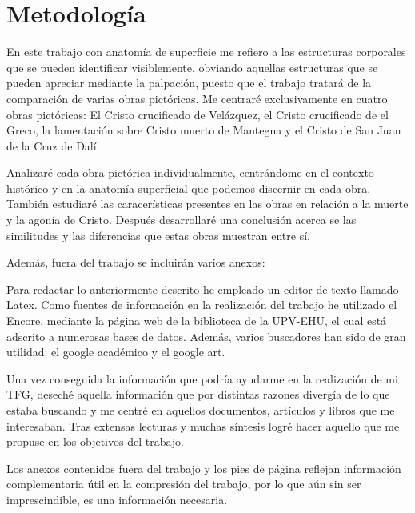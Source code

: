 \section{Metodología}
En este trabajo con anatomía de superficie me refiero a las estructuras corporales que se pueden identificar visiblemente, obviando aquellas estructuras que se pueden apreciar mediante la palpación, puesto que el trabajo tratará de la comparación de varias obras pictóricas. Me centraré exclusivamente en cuatro obras pictóricas: El Cristo crucificado de Velázquez, el Cristo crucificado de el Greco, la lamentación sobre Cristo muerto de Mantegna %
y el Cristo de San Juan de la Cruz de Dalí.


Analizaré cada obra pictórica individualmente, centrándome en el contexto histórico y en la anatomía superficial que podemos discernir en cada obra. También estudiaré las caracerísticas presentes en las obras en relación a la muerte y la agonía de Cristo. Después desarrollaré una conclusión acerca se las similitudes y las diferencias que estas obras muestran entre sí.

Además, fuera del trabajo se incluirán varios anexos:

\vspace{12pt}

Para redactar lo anteriormente descrito he empleado un editor de texto llamado Latex. Como fuentes de información en la realización del trabajo he utilizado el Encore, mediante la página web de la biblioteca de la UPV-EHU, el cual está adscrito a numerosas bases de datos. Además, varios buscadores han sido de gran utilidad: el google académico y el google art.

Una vez conseguida la información que podría ayudarme en la realización de mi TFG, deseché aquella información que por distintas razones divergía de lo que estaba buscando y me centré en aquellos documentos, artículos y libros que me interesaban. Tras extensas lecturas y muchas síntesis logré hacer aquello que me propuse en los objetivos del trabajo.

Los anexos contenidos fuera del trabajo y los pies de página reflejan información complementaria útil en la compresión del trabajo, por lo que aún sin ser imprescindible, es una información necesaria.